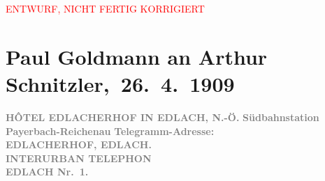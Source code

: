 
\begin{center}
            \textcolor{red}{ENTWURF, NICHT FERTIG KORRIGIERT}
                      \end{center}
            
         
         \renewcommand{\erwaehntePersonen}{Personen: Eva Marie Goldmann, Rudolf Lothar, Olga Schnitzler, Lili Schnitzler, Heinrich Schnitzler}
         \renewcommand{\erwaehnteInstitutionen}{Institutionen: k. k. Post- und Telegraphenverwaltung}
         \renewcommand{\erwaehnteOrte}{Orte: Bahnhof Payerbach-Reichenau, Berlin, Deutsches Theater Berlin, Edlach, Hotel Edlacherhof, Niederösterreich, Semmering, Wien}
         \renewcommand{\erwaehnteWerke}{Werke: Faust bei Reinhardt, Pester Lloyd}
               \section[ Paul Goldmann an Arthur Schnitzler, 26. 4. 1909]{ Paul Goldmann an Arthur Schnitzler, 26. 4. 1909}\nopagebreak{}\rehead{ }\begin{ledgroupsized}[t]{13cm}\normalsize\beginnumbering \toendnotes[C]{\smallbreak\pagebreak[2]} 
\toendnotes[C]{\smallbreak}\pstart
           \noindent{}{\pb}\textcolor{gray}{\textbf{HÔTEL EDLACHERHOF IN EDLACH, N.-Ö.}}\pend
           \pstart
           \raggedleft{}\textcolor{gray}{\textbf{\textbf{Südbahnstation Payerbach-Reichenau}}}\pend
           \pstart
           \noindent{}\textcolor{gray}{\textbf{Telegramm-Adresse:}}{\\}\textcolor{gray}{\textbf{\textbf{EDLACHERHOF, EDLACH.}}}{\\}\textcolor{gray}{\textbf{INTERURBAN TELEPHON}}{\\}\textcolor{gray}{\textbf{\textbf{EDLACH Nr. 1.}}}\pend

\end{ledgroupsized}
